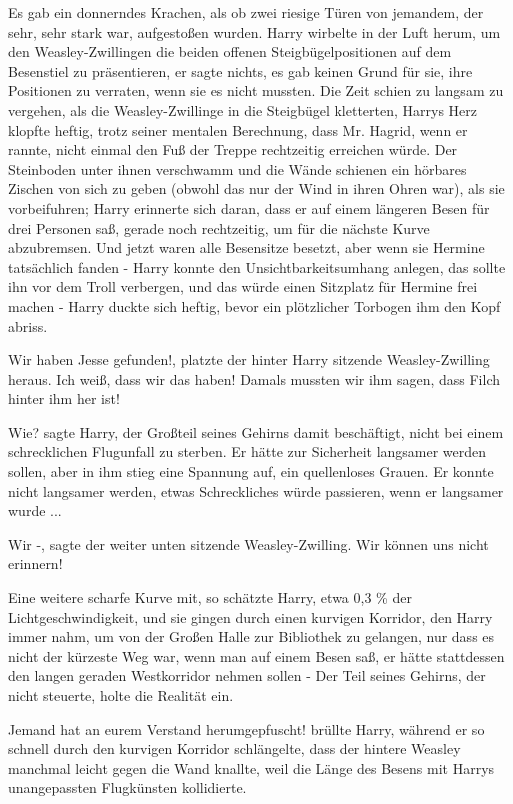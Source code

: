Es gab ein donnerndes Krachen, als ob zwei riesige Türen von jemandem, der sehr,
sehr stark war, aufgestoßen wurden. Harry wirbelte in der Luft herum, um den
Weasley-Zwillingen die beiden offenen Steigbügelpositionen auf dem Besenstiel zu
präsentieren, er sagte nichts, es gab keinen Grund für sie, ihre Positionen zu
verraten, wenn sie es nicht mussten. Die Zeit schien zu langsam zu vergehen, als
die Weasley-Zwillinge in die Steigbügel kletterten, Harrys Herz klopfte heftig,
trotz seiner mentalen Berechnung, dass Mr. Hagrid, wenn er rannte, nicht einmal
den Fuß der Treppe rechtzeitig erreichen würde. Der Steinboden unter ihnen
verschwamm und die Wände schienen ein hörbares Zischen von sich zu geben (obwohl
das nur der Wind in ihren Ohren war), als sie vorbeifuhren; Harry erinnerte sich
daran, dass er auf einem längeren Besen für drei Personen saß, gerade noch
rechtzeitig, um für die nächste Kurve abzubremsen. Und jetzt waren alle
Besensitze besetzt, aber wenn sie Hermine tatsächlich fanden - Harry konnte den
Unsichtbarkeitsumhang anlegen, das sollte ihn vor dem Troll verbergen, und das
würde einen Sitzplatz für Hermine frei machen - Harry duckte sich heftig, bevor
ein plötzlicher Torbogen ihm den Kopf abriss.

\glqq{}Wir haben Jesse gefunden!\grqq{}, platzte der hinter Harry sitzende
Weasley-Zwilling heraus. \glqq{}Ich weiß, dass wir das haben! Damals mussten wir
ihm sagen, dass Filch hinter ihm her ist!\grqq{}

\glqq{}Wie?\grqq{} sagte Harry, der Großteil seines Gehirns damit beschäftigt,
nicht bei einem schrecklichen Flugunfall zu sterben. Er hätte zur Sicherheit
langsamer werden sollen, aber in ihm stieg eine Spannung auf, ein quellenloses
Grauen. Er konnte nicht langsamer werden, etwas Schreckliches würde passieren,
wenn er langsamer wurde ...

\glqq{}Wir -\grqq{}, sagte der weiter unten sitzende Weasley-Zwilling. \glqq{}Wir
können uns nicht erinnern!\grqq{}

Eine weitere scharfe Kurve mit, so schätzte Harry, etwa 0,3 \% der
Lichtgeschwindigkeit, und sie gingen durch einen kurvigen Korridor, den Harry
immer nahm, um von der Großen Halle zur Bibliothek zu gelangen, nur dass es
nicht der kürzeste Weg war, wenn man auf einem Besen saß, er hätte stattdessen
den langen geraden Westkorridor nehmen sollen - Der Teil seines Gehirns, der
nicht steuerte, holte die Realität ein.

\glqq{}Jemand hat an eurem Verstand herumgepfuscht!\grqq{} brüllte Harry, während
er so schnell durch den kurvigen Korridor schlängelte, dass der hintere Weasley
manchmal leicht gegen die Wand knallte, weil die Länge des Besens mit Harrys
unangepassten Flugkünsten kollidierte.

